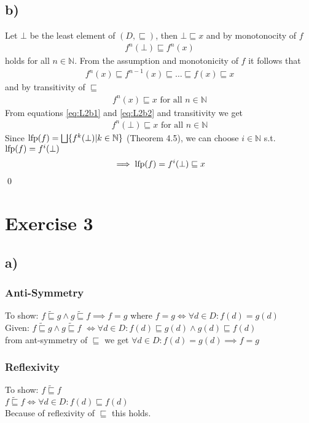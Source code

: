 \documentclass[fleqn,12pt]{article}
\begin{document}
\subsection*{b)}
\newcommand\sqle\sqsubseteq
Let $\bot$ be the least element of $(D, \sqle)$, then $\bot \sqle x$ and by monotonocity of $f$
\begin{align}
	\label{eq:L2b1}
	f^n(\bot) \sqle f^n(x)
\end{align}
holds for all $n \in \mathbb{N}$. From the assumption and monotonicity of $f$ it follows that
\begin{align*}
	f^n(x) \sqle f^{n-1}(x) \sqle \dots \sqle f(x) \sqle x
\end{align*}
and by transitivity of $\sqle$
\begin{align}
	\label{eq:L2b2}
	f^n(x) \sqle x \text{ for all } n \in \mathbb N
\end{align}
From equations \ref{eq:L2b1} and \ref{eq:L2b2} and transitivity we get
\begin{align}
	f^n(\bot) \sqle x \text{ for all } n \in \mathbb N
\end{align}
Since $\text{lfp}(f)=\bigsqcup\{f^k(\bot) | k \in \mathbb N\}$ (Theorem 4.5), we can choose $i \in \mathbb N$ s.t. $\text{lfp}(f) = f^i(\bot)$
\begin{align*}
\implies \lfp(f)=f^i(\bot) \sqle x
\end{align*}
\qed

\section*{Exercise 3}
\subsection*{a)}
\newcommand\sqt{\widetilde\sqsubseteq}
\subsubsection*{Anti-Symmetry}
To show: $f \sqt g \land g \sqt f \implies f = g$ where $f = g \Leftrightarrow \forall d \in D: f(d) = g(d)$\\
Given: $f \sqt g \land g \sqt f$
$\Leftrightarrow \forall d \in D: f(d) \sqle g(d) \land g(d) \sqle f(d)$ \\
from ant-symmetry of $\sqle$ we get $ \forall d \in D: f(d) = g(d) \implies f = g$

\subsubsection*{Reflexivity}
To show: $f \sqt f$\\
$f \sqt f \Leftrightarrow \forall d \in D: f(d) \sqle f(d)$\\
Because of reflexivity of $\sqle$ this holds.
\end{document}
